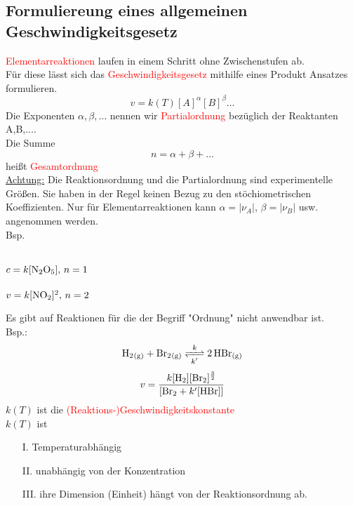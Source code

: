 \documentclass[a4paper, fleqn]{article}
\begin{document}
\subsection{Formuliereung eines allgemeinen Geschwindigkeitsgesetz}
\textcolor{red}{Elementarreaktionen} laufen in einem Schritt ohne Zwischenstufen ab.\\
Für diese lässt sich das \textcolor{red}{Geschwindigkeitsgesetz} mithilfe eines Produkt Ansatzes formulieren.
\begin{equation*}
    v = k(T)[A]^\alpha[B]^\beta\dots
\end{equation*}
Die Exponenten $\alpha,\beta,\dots$ nennen wir \textcolor{red}{Partialordnung} bezüglich der Reaktanten A,B,$\dots$.\\
Die Summe
\begin{equation*}
    n = \alpha + \beta + \dots
\end{equation*}
heißt \textcolor{red}{Gesamtordnung}\\
\underline{Achtung:} Die Reaktionsordnung und die Partialordnung sind experimentelle Größen. Sie haben in der Regel keinen Bezug zu den stöchiometrischen Koeffizienten. Nur für Elementarreaktionen kann $\alpha = \lvert \nu_A \rvert$, $\beta = \lvert \nu_B \rvert$ usw. angenommen werden.\\
Bsp.
\begin{center}
    \\
        $c = k [\ce{N2O5}],\, n=1$\\
    \\
        $v = k[\ce{NO2}]^2 ,\, n=2$
\end{center}
Es gibt auf Reaktionen für die der Begriff "Ordnung" nicht anwendbar ist.\\
Bsp.:
\begin{equation*}
    \ce{H2_{(g)} + Br2_{(g)} <=>[{$k$}][{$k'$}] 2HBr_{(g)}}
\end{equation*}
\begin{equation*}
    v = \frac{k[\ce{H2}][\ce{Br2}]^\frac{3}{2}}{[\ce{Br2}+k'[\ce{HBr}]]}
\end{equation*}
$k(T)$ ist die \textcolor{red}{(Reaktions-)Geschwindigkeitskonstante}\\
$k(T)$ ist
\begin{itemize}
    \item[I.] Temperaturabhängig
    \item[II.] unabhängig von der Konzentration 
    \item[III.] ihre Dimension (Einheit) hängt von der Reaktionsordnung ab.  
\end{itemize}
\end{document}
